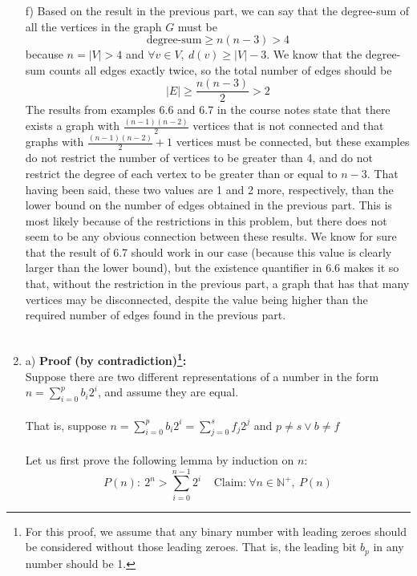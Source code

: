 \documentclass{article}
\newcommand{\N}{\mathbb{N}}
\begin{document}
\begin{enumerate}
	f) Based on the result in the previous part, we can say that the degree-sum of all the vertices in the graph $G$ must be $$\textrm{degree-sum}\geq n(n-3)>4$$ 
	because $n=|V|>4$ and $\forall v \in V,\ d(v)\geq |V|-3$. We know that the degree-sum counts all edges exactly twice, so the total number of edges should be $$|E|\geq \frac{n(n-3)}{2}>2$$
	The results from examples 6.6 and 6.7 in the course notes state that there exists a graph with $\frac{(n-1)(n-2)}{2}$ vertices that is not connected and that graphs with $\frac{(n-1)(n-2)}{2}+1$ vertices must be connected, but these examples do not restrict the number of vertices to be greater than 4, and do not restrict the degree of each vertex to be greater than or equal to $n-3$. That having been said, these two values are 1 and 2 more, respectively, than the lower bound on the number of edges obtained in the previous part. This is most likely because of the restrictions in this problem, but there does not seem to be any obvious connection between these results. We know for sure that the result of 6.7 should work in our case (because this value is clearly larger than the lower bound), but the existence quantifier in 6.6 makes it so that, without the restriction in the previous part, a graph that has that many vertices may be disconnected, despite the value being higher than the required number of edges found in the previous part. \\\\
	
	\item a) \textbf{Proof (by contradiction)\footnote{For this proof, we assume that any binary number with leading zeroes should be considered without those leading zeroes. That is, the leading bit $b_p$ in any number should be 1.}:}\\
	Suppose there are two different representations of a number in the form $n = {\displaystyle \sum_{i = 0}^{p} b_i2^i}$, and assume they are equal.\\\\
	That is, suppose $n = {\displaystyle \sum_{i = 0}^{p} b_i2^i} = {\displaystyle \sum_{j = 0}^{s} f_j2^j}$ and $p\neq s \vee b \neq f$\\\\
	
	Let us first prove the following lemma by induction on $n$: $$P(n):\ 2^n > \sum_{i=0}^{n-1}2^i\ \ \ \ \ \textrm{Claim:}\ \forall n \in \N^+,\ P(n)$$
	

\end{enumerate}
\end{document}
